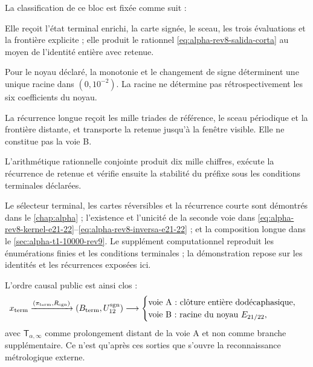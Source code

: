 La classification de ce bloc est fixée comme suit :
\begingroup
\raggedright
\begin{description}[style=nextline,leftmargin=3.2cm,labelwidth=2.8cm,labelsep=.4cm]
\item[Voie A : clôture dodécaphasique.]
Elle reçoit l’état terminal enrichi, la carte signée, le sceau, les trois
évaluations et la frontière explicite ; elle produit le rationnel
\eqref{eq:alpha-rev8-salida-corta} au moyen de l’identité entière avec retenue.

\item[Voie B : équation \(E_{21/22}\).]
Pour le noyau déclaré, la monotonie et le changement de signe déterminent une
unique racine dans \((0,10^{-2})\). La racine ne détermine pas rétrospectivement les
six coefficients du noyau.

\item[Prolongement \(\mathsf T_{\alpha,\infty}\).]
La récurrence longue reçoit les mille triades de référence, le sceau périodique
et la frontière distante, et transporte la retenue jusqu’à la fenêtre visible. Elle ne
constitue pas la voie B.

\item[Composition \(\mathcal G_9\to\mathsf T_{\alpha,\infty}\).]
L’arithmétique rationnelle conjointe produit dix mille chiffres, exécute la
récurrence de retenue et vérifie ensuite la stabilité du préfixe sous les
conditions terminales déclarées.
\end{description}
\endgroup

Le sélecteur terminal, les cartes réversibles et la récurrence courte sont
démontrés dans le \cref{chap:alpha} ; l’existence et l’unicité de la seconde voie
dans \eqref{eq:alpha-rev8-kernel-e21-22}--\eqref{eq:alpha-rev8-inversa-e21-22} ; et la composition longue dans le
\cref{sec:alpha-t1-10000-rev9}. Le supplément computationnel reproduit les
énumérations finies et les conditions terminales ; la démonstration repose
sur les identités et les récurrences exposées ici.

L’ordre causal public est ainsi clos :
\[
 x_{\rm term}
 \xrightarrow{(\pi_{\rm term},R_{\rm sgn})}
 (B_{\rm term},U_{12}^{\rm sgn})
 \longrightarrow
 \begin{cases}
 \text{voie A : clôture entière dodécaphasique},\\
 \text{voie B : racine du noyau }E_{21/22},
 \end{cases}
\]
avec \(\mathsf T_{\alpha,\infty}\) comme prolongement distant de la voie A et non
comme branche supplémentaire. Ce n’est
qu’après ces sorties que s’ouvre la reconnaissance métrologique externe.

